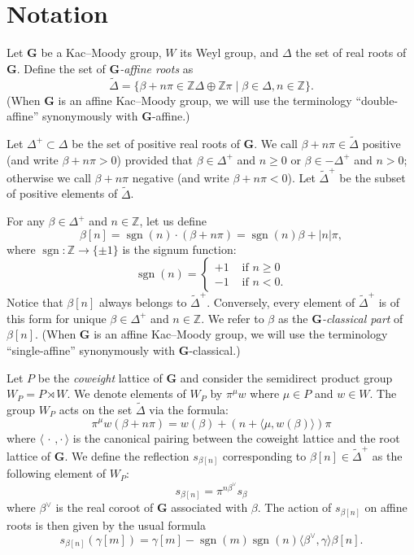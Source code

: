 \documentclass[ALCO,ThmDefs,Unicode]{cedram}
\DeclareMathOperator{\sgn}{sgn}
\newcommand{\betacheck}{\beta^\vee}
\newcommand{\bG}{\mathbf{G}}
\newcommand{\ZZ}{\mathbb{Z}}
\newcommand{\suchthat}{\mid}
\newcommand{\textif}{\text{ if }}
\newcommand{\tDelta}{\widetilde{\Delta}}
\begin{document}
\section{Notation}\label{sec:notation}

Let $\bG$ be a Kac--Moody group, $W$ its Weyl group, and $\Delta$ the set of real roots of $\bG$. Define the set of \emph{$\bG$-affine roots} as
\begin{equation}
\tDelta = \{\beta + n \pi \in \ZZ\Delta\oplus\ZZ\pi \suchthat \beta\in\Delta, n\in \ZZ\}.
\end{equation}
(When $\bG$ is an affine Kac--Moody group, we will use the terminology ``double-affine'' synonymously with $\bG$-affine.)

Let $\Delta^+\subset\Delta$ be the set of positive real roots of $\bG$. We call $\beta+n\pi\in\tDelta$ positive (and write $\beta+n\pi>0$) provided that $\beta\in\Delta^+$ and $n\ge 0$ or $\beta\in -\Delta^+$ and $n>0$; otherwise we call $\beta+n\pi$ negative (and write $\beta+n\pi<0$). Let $\tDelta^+$ be the subset of positive elements of $\tDelta$.

For any $\beta\in\Delta^+$ and $n\in\ZZ$, let us define
\begin{equation}
\beta[n] = \sgn(n)\cdot (\beta + n \pi) = \sgn(n)\beta + |n| \pi,
\end{equation}
where $\sgn : \ZZ \rightarrow \{\pm 1\}$ is the signum function:
\begin{equation}\label{eq:020}
\sgn(n) =
\begin{cases}
+ 1 & \textif n \geq 0 \\
- 1 & \textif n < 0.
\end{cases}
\end{equation}
Notice that $\beta[n]$ always belongs to $\tDelta^+$. Conversely, every element of $\tDelta^+$ is of this form for unique $\beta\in\Delta^+$ and $n\in\ZZ$. We refer to $\beta$ as the \emph{$\bG$-classical part} of $\beta[n]$. (When $\bG$ is an affine Kac--Moody group, we will use the terminology ``single-affine'' synonymously with $\bG$-classical.)

Let $P$ be the \emph{coweight} lattice of $\bG$ and consider the semidirect product group $W_P=P\rtimes W$. We denote elements of $W_P$ by $\pi^\mu w$ where $\mu\in P$ and $w\in W$. The group $W_P$ acts on the set $\tDelta$ via the formula:
\begin{equation}
\pi^\mu w(\beta+n\pi) = w(\beta)+(n+\langle \mu, w(\beta)\rangle)\pi
\end{equation}
where $\langle{\,\cdot\,,\cdot\,}\rangle$ is the canonical pairing between the coweight lattice and the root lattice of $\bG$. We define the reflection $s_{\beta[n]}$ corresponding to $\beta[n]\in\tDelta^+$ as the following element of $W_{P}$:
\begin{equation}
s_{\beta[n]} = \pi^{n \betacheck} s_\beta
\end{equation}
where $\betacheck$ is the real coroot of $\bG$ associated with $\beta$. The action of $s_{\beta[n]}$ on affine roots is then given by the usual formula
\begin{equation}
s_{\beta[n]}(\gamma[m]) = \gamma[m]- \sgn(m)\sgn(n)\langle\betacheck,\gamma\rangle\beta[n].
\end{equation}
\end{document}
